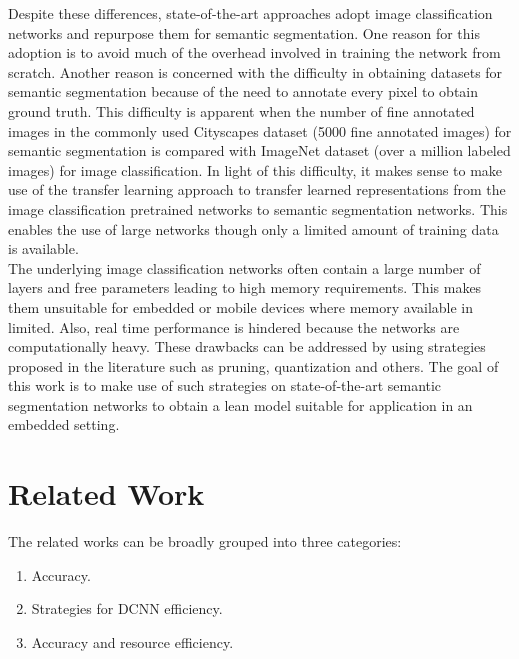 \documentclass[a4paper,12pt]{article}
\begin{document}
Despite these differences, state-of-the-art approaches adopt image classification networks and repurpose them for semantic segmentation. One reason for this adoption is to avoid much of the overhead involved in training the network from scratch. Another reason is concerned with the difficulty in obtaining datasets for semantic segmentation because of the need to annotate every pixel to obtain ground truth. This difficulty is apparent when the number of fine annotated images in the commonly used Cityscapes dataset (5000 fine annotated images) for semantic segmentation is compared with ImageNet dataset (over a million labeled images) for image classification. In light of this difficulty, it makes sense to make use of the transfer learning approach to transfer learned representations from the image classification pretrained networks to semantic segmentation networks. This enables the use of large networks though only a limited amount of training data is available.\\

The underlying image classification networks often contain a large number of layers and free parameters leading to high memory requirements. This makes them unsuitable for embedded or mobile devices where memory available in limited. Also, real time performance is hindered because the networks are computationally heavy. These drawbacks can be addressed by using strategies proposed in the literature such as pruning, quantization and others. The goal of this work is to make use of such strategies on state-of-the-art semantic segmentation networks to obtain a lean model suitable for application in an embedded setting.

\section{Related Work}
The related works can be broadly grouped into three categories:
\begin{enumerate}
	\item Accuracy.
	\item Strategies for DCNN efficiency.
	\item Accuracy and resource efficiency.
\end{enumerate}
\end{document}
